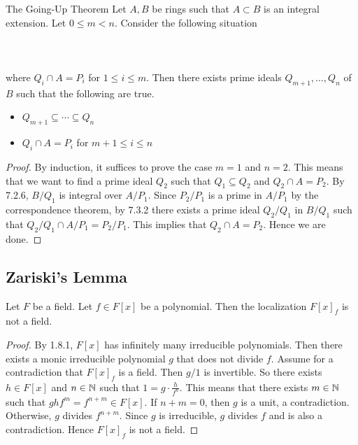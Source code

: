 \documentclass[a4paper]{article}
\begin{document}
\begin{thm}{The Going-Up Theorem}{} Let $A,B$ be rings such that $A\subset B$ is an integral extension. Let $0\leq m<n$. Consider the following situation \\~\\
\\~\\
where $Q_i\cap A=P_i$ for $1\leq i\leq m$. Then there exists prime ideals $Q_{m+1},\dots,Q_n$ of $B$ such that the following are true. 
\begin{itemize}
\item $Q_{m+1}\subseteq\cdots\subseteq Q_n$
\item $Q_i\cap A=P_i$ for $m+1\leq i\leq n$
\end{itemize} \tcbline
\begin{proof}
By induction, it suffices to prove the case $m=1$ and $n=2$. This means that we want to find a prime ideal $Q_2$ such that $Q_1\subseteq Q_2$ and $Q_2\cap A=P_2$. By 7.2.6, $B/Q_1$ is integral over $A/P_1$. Since $P_2/P_1$ is a prime in $A/P_1$ by the correspondence theorem, by 7.3.2 there exists a prime ideal $Q_2/Q_1$ in $B/Q_1$ such that $Q_2/Q_1\cap A/P_1=P_2/P_1$. This implies that $Q_2\cap A=P_2$. Hence we are done. 
\end{proof}
\end{thm}

\subsection{Zariski's Lemma}
\begin{lmm}{}{} Let $F$ be a field. Let $f\in F[x]$ be a polynomial. Then the localization $F[x]_f$ is not a field. \tcbline
\begin{proof}
By 1.8.1, $F[x]$ has infinitely many irreducible polynomials. Then there exists a monic irreducible polynomial $g$ that does not divide $f$. Assume for a contradiction that $F[x]_f$ is a field. Then $g/1$ is invertible. So there exists $h\in F[x]$ and $n\in\mathbb{N}$ such that $1=g\cdot\frac{h}{f^n}$. This means that there exists $m\in\mathbb{N}$ such that $ghf^m=f^{n+m}\in F[x]$. If $n+m=0$, then $g$ is a unit, a contradiction. Otherwise, $g$ divides $f^{n+m}$. Since $g$ is irreducible, $g$ divides $f$ and is also a contradiction. Hence $F[x]_f$ is not a field. 
\end{proof}
\end{lmm}
\end{document}
